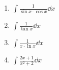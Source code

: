 \documentclass[a4paper, 12pt]{scrartcl}
\begin{document}
\begin{enumerate}
\begin{enumerate}
          \item $\displaystyle
                  \int \frac{1}{\sin x \cdot \cos x} \dd x
                $

          \item $\displaystyle
                  \int \frac{1}{\tan x} \dd x
                $

          \item $\displaystyle
                  \int \frac{1}{x \cdot \ln x} \dd x
                $

          \item $\displaystyle
                  \int \frac{2x + 1}{x^2 + 2} \dd x
                $
        \end{enumerate}
\end{enumerate}

\end{document}
